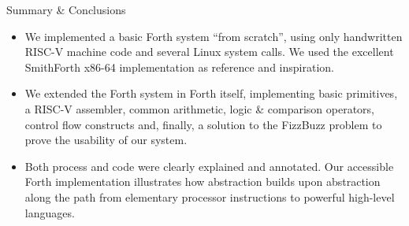 \documentclass[presentation, bigger]{beamer}
\begin{document}
\begin{frame}[label={sec:orge80e3fe}]{Summary \& Conclusions}
\begin{itemize}
\item We implemented a basic Forth system ``from scratch'', using only
handwritten RISC-V machine code and several Linux system calls.  We
used the excellent SmithForth x86-64 implementation as reference and
inspiration. \pause
\item We extended the Forth system in Forth itself, implementing basic
primitives, a RISC-V assembler, common arithmetic, logic \&
comparison operators, control flow constructs and, finally, a
solution to the FizzBuzz problem to prove the usability of our
system. \pause
\item Both process and code were clearly explained and annotated.  Our
accessible Forth implementation illustrates how abstraction builds
upon abstraction along the path from elementary processor
instructions to powerful high-level languages.
\end{itemize}
\end{frame}
\end{document}
